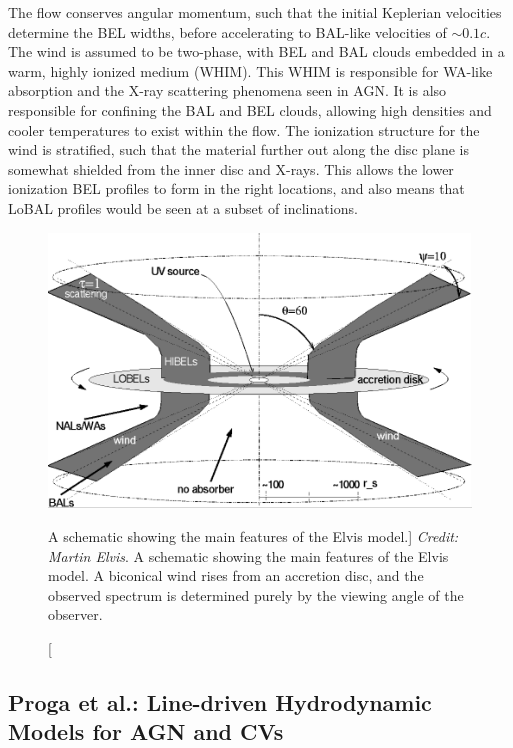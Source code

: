 The flow conserves angular momentum, such that the initial Keplerian velocities
determine the BEL widths, before accelerating to BAL-like velocities of $\sim0.1c$.
The wind is assumed to be two-phase, with BEL and BAL clouds embedded in 
a warm, highly ionized medium (WHIM). This WHIM is responsible for WA-like absorption
and the X-ray scattering phenomena seen in AGN. It is also responsible for confining
the BAL and BEL clouds, allowing high densities and cooler temperatures to exist
within the flow. The ionization structure for the wind is stratified, such that the material
further out along the disc plane is somewhat shielded from the inner disc and X-rays.
This allows the lower ionization BEL profiles to form in the right locations,
and also means that LoBAL profiles would be seen at a subset of inclinations.

\begin{figure}
\centering
\includegraphics[width=1.0\textwidth]{figures/02-outflows/elvis.png}
\caption
[A schematic showing the main features of the Elvis model.]
{
{\sl Credit: Martin Elvis}. 
A schematic showing the main features of the Elvis model. A biconical
wind rises from an accretion disc, and the observed spectrum is determined 
purely by the viewing angle of the observer.
} 
\label{fig:elvis}
\end{figure}

\subsection{Proga et al.: Line-driven Hydrodynamic Models for AGN and CVs}
\label{sec:proga}

